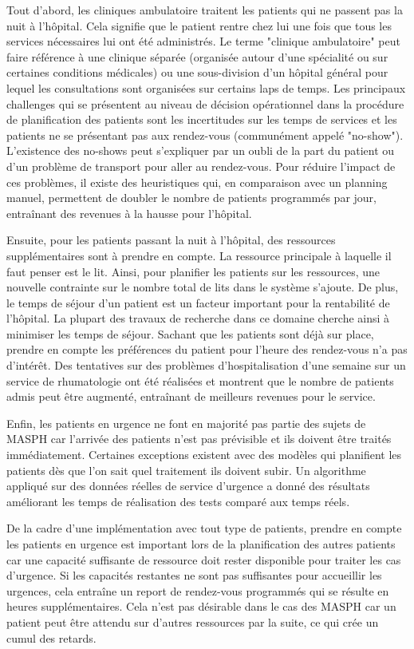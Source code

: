 \documentclass{polytech/polytech}
\begin{document}
Tout d'abord, les cliniques ambulatoire traitent les patients qui ne passent pas la nuit à l'hôpital. Cela signifie que le patient rentre chez lui une fois que tous les services nécessaires lui ont été administrés. Le terme "clinique ambulatoire" peut faire référence à une clinique séparée (organisée autour d'une spécialité ou sur certaines conditions médicales) ou une sous-division d'un hôpital général pour lequel les consultations sont organisées sur certains laps de temps. Les principaux challenges qui se présentent au niveau de décision opérationnel dans la procédure de planification des patients sont les incertitudes sur les temps de services et les patients ne se présentant pas aux rendez-vous (communément appelé "no-show"). L'existence des no-shows peut s'expliquer par un oubli de la part du patient ou d'un problème de transport pour aller au rendez-vous. Pour réduire l'impact de ces problèmes, il existe des heuristiques qui, en comparaison avec un planning manuel, permettent de doubler le nombre de patients programmés par jour, entraînant des revenues à la hausse pour l'hôpital.

Ensuite, pour les patients passant la nuit à l'hôpital, des ressources supplémentaires sont à prendre en compte. La ressource principale à laquelle il faut penser est le lit. Ainsi, pour planifier les patients sur les ressources, une nouvelle contrainte sur le nombre total de lits dans le système s'ajoute. De plus, le temps de séjour d'un patient est un facteur important pour la rentabilité de l'hôpital. La plupart des travaux de recherche dans ce domaine cherche ainsi à minimiser les temps de séjour. Sachant que les patients sont déjà sur place, prendre en compte les préférences du patient pour l'heure des rendez-vous n'a pas d'intérêt. Des tentatives sur des problèmes d'hospitalisation d'une semaine sur un service de rhumatologie ont été réalisées et montrent que le nombre de patients admis peut être augmenté, entraînant de meilleurs revenues pour le service.

Enfin, les patients en urgence ne font en majorité pas partie des sujets de MASPH car l'arrivée des patients n'est pas prévisible et ils doivent être traités immédiatement. Certaines exceptions existent avec des modèles qui planifient les patients dès que l'on sait quel traitement ils doivent subir. Un algorithme appliqué sur des données réelles de service d'urgence a donné des résultats améliorant les temps de réalisation des tests comparé aux temps réels.

De la cadre d'une implémentation avec tout type de patients, prendre en compte les patients en urgence est important lors de la planification des autres patients car une capacité suffisante de ressource doit rester disponible pour traiter les cas d'urgence. Si les capacités restantes ne sont pas suffisantes pour accueillir les urgences, cela entraîne un report de rendez-vous programmés qui se résulte en heures supplémentaires. Cela n'est pas désirable dans le cas des MASPH car un patient peut être attendu sur d'autres ressources par la suite, ce qui crée un cumul des retards.
\end{document}
